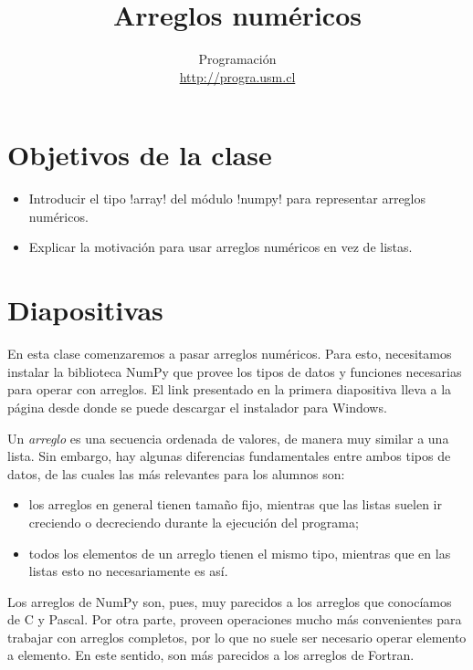 \documentclass[10pt]{article}
\title{Arreglos numéricos}
\author{Programación \\ \url{http://progra.usm.cl}}
\date{}
\begin{document}
  \maketitle

  \section*{Objetivos de la clase}
  \begin{itemize}
    \item Introducir el tipo \li!array!
      del módulo \li!numpy!
      para representar arreglos numéricos.
    \item Explicar la motivación
      para usar arreglos numéricos
      en vez de listas.
  \end{itemize}

  \section*{Diapositivas}


  En esta clase
  comenzaremos a pasar arreglos numéricos.
  Para esto,
  necesitamos instalar la biblioteca NumPy
  que provee los tipos de datos y funciones
  necesarias para operar con arreglos.
  El link presentado en la primera diapositiva
  lleva a la página desde donde se puede descargar
  el instalador para Windows.

  Un \emph{arreglo}
  es una secuencia ordenada de valores,
  de manera muy similar a una lista.
  Sin embargo,
  hay algunas diferencias fundamentales
  entre ambos tipos de datos,
  de las cuales las más relevantes
  para los alumnos son:
  \begin{itemize}
    \item los arreglos en general tienen tamaño fijo,
      mientras que las listas suelen ir creciendo
      o decreciendo durante la ejecución del programa;
    \item todos los elementos de un arreglo
      tienen el mismo tipo, mientras que en las listas
      esto no necesariamente es así.
  \end{itemize}

  Los arreglos de NumPy son, pues,
  muy parecidos a los arreglos que conocíamos
  de C y Pascal.
  Por otra parte,
  proveen operaciones mucho más convenientes
  para trabajar con arreglos completos,
  por lo que no suele ser necesario
  operar elemento a elemento.
  En este sentido,
  son más parecidos a los arreglos de Fortran.
\end{document}
